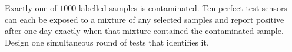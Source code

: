 Exactly one of $1000$ labelled samples is contaminated. Ten perfect test sensors can each be exposed to a mixture of any selected samples and report positive after one day exactly when that mixture contained the contaminated sample. Design one simultaneous round of tests that identifies it.

